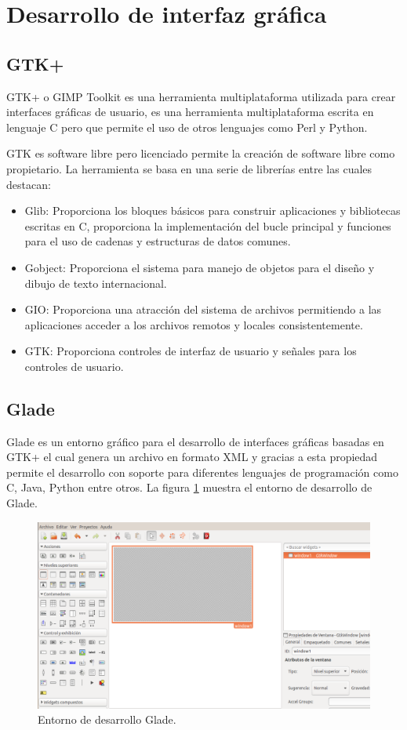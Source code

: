 \section{Desarrollo de interfaz gráfica}
 \subsection{GTK+}
GTK+ o GIMP Toolkit es una herramienta multiplataforma utilizada para crear interfaces gráficas de usuario, es una herramienta multiplataforma escrita en lenguaje C pero que permite el uso de otros lenguajes como Perl y Python.

GTK es software libre pero licenciado permite la creación de software libre como propietario.
La herramienta se basa en una serie de librerías entre las cuales destacan:

\begin{itemize}
\item Glib: Proporciona los bloques básicos para construir aplicaciones y bibliotecas escritas en C, proporciona la implementación del bucle principal y funciones para el uso de cadenas y estructuras de datos comunes. 
\item Gobject: Proporciona el sistema para manejo de objetos para el diseño y dibujo de texto internacional.
\item GIO: Proporciona una atracción del sistema de archivos permitiendo a las aplicaciones acceder a los archivos remotos y locales consistentemente.
\item GTK: Proporciona controles de interfaz de usuario y señales para los controles de usuario.
\end{itemize}

\subsection{Glade}
Glade es un entorno gráfico para el desarrollo de interfaces gráficas basadas en GTK+ el cual genera un archivo en formato XML  y gracias a esta propiedad permite el desarrollo con soporte para diferentes lenguajes de programación como C, Java, Python entre otros.
La figura \ref{fig:glade} muestra el entorno de desarrollo de Glade.

\begin{figure}[h]
	\centering
	\includegraphics[scale=.3]{./Figures/glade.png}
	\caption{Entorno de desarrollo Glade.}
	\label{fig:glade}
\end{figure}


